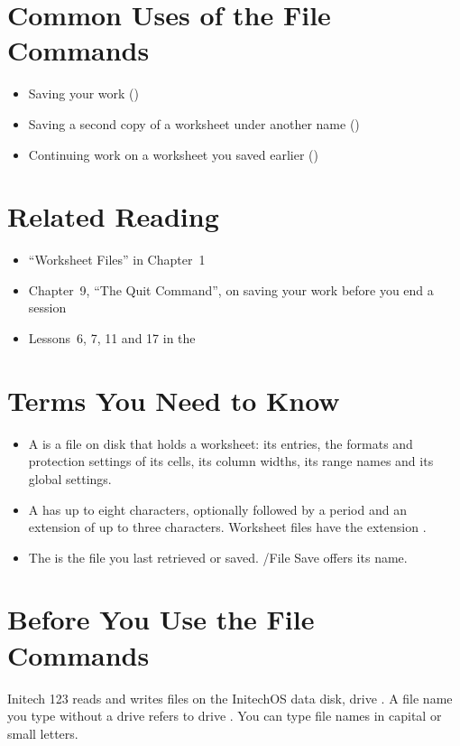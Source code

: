 \section{Common Uses of the File Commands}
\begin{itemize}
\item Saving your work ()
\item Saving a second copy of a worksheet under another name
  ()
\item Continuing work on a worksheet you saved earlier
  ()
\end{itemize}

\section{Related Reading}
\begin{itemize}
\item ``Worksheet Files'' in Chapter~1
\item Chapter~9, ``The Quit Command'', on saving your work before you end
  a session
\item Lessons~6, 7, 11 and 17 in the 
\end{itemize}

\section{Terms You Need to Know}
\begin{itemize}
\item A  is a file on disk that holds a worksheet: its
  entries, the formats and protection settings of its cells, its column
  widths, its range names and its global settings.
\item A  has up to eight characters, optionally followed by
  a period and an extension of up to three characters.  Worksheet files
  have the extension .
\item The  is the file you last retrieved or saved.
  /File Save offers its name.
\end{itemize}

\section{Before You Use the File Commands}
Initech 123 reads and writes files on the InitechOS data disk, drive
.  A file name you type without a drive refers to drive .
You can type file names in capital or small letters.


